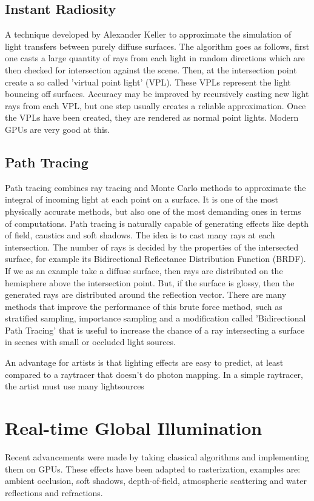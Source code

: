 	\subsection {Instant Radiosity}
		A technique developed by Alexander Keller to approximate the simulation of light
		transfers between purely diffuse surfaces. The algorithm goes as follows, first
		one casts a large quantity of rays from each light in random directions which
		are then checked for intersection against the scene. Then, at the intersection
		point create a so called 'virtual point light' (VPL). These VPLs represent the
		light bouncing off surfaces. Accuracy may be improved by recursively casting new
		light rays from each VPL, but one step usually creates a reliable approximation.
		Once the VPLs have been created, they are rendered as normal point lights.
		Modern GPUs are very good at this.

	\subsection {Path Tracing}
		Path tracing combines ray tracing and Monte Carlo methods to approximate the
		integral of incoming light at each point on a surface. It is one of the most physically
		accurate methods, but also one of the most demanding ones in terms of
		computations. Path tracing is naturally capable of generating effects like depth
		of field, caustics and soft shadows. The idea is to cast many rays at each
		intersection. The number of rays is decided by the properties of the intersected
		surface, for example its Bidirectional Reflectance Distribution Function (BRDF). 
		If we as an example take a diffuse surface, then rays are distributed on the hemisphere 
		above the intersection point. But, if the surface is glossy, then the generated 
		rays are distributed around the reflection vector. 
		There are many methods that improve the performance of this brute force
		method, such as stratified sampling, importance sampling and a modification
		called 'Bidirectional Path Tracing' that is useful to increase the chance of a
		ray intersecting a surface in scenes with small or occluded light sources.
		
		An advantage for artists is that lighting effects are easy to predict, at least compared to a raytracer that doesn't do photon mapping. In a simple raytracer, the artist must use many lightsources 

	\section {Real-time Global Illumination}  
		Recent advancements were made by taking classical algorithms and implementing them on GPUs. 
		These effects have been adapted to rasterization, examples are: ambient occlusion, soft shadows,
		depth-of-field, atmospheric scattering and water reflections and refractions.

